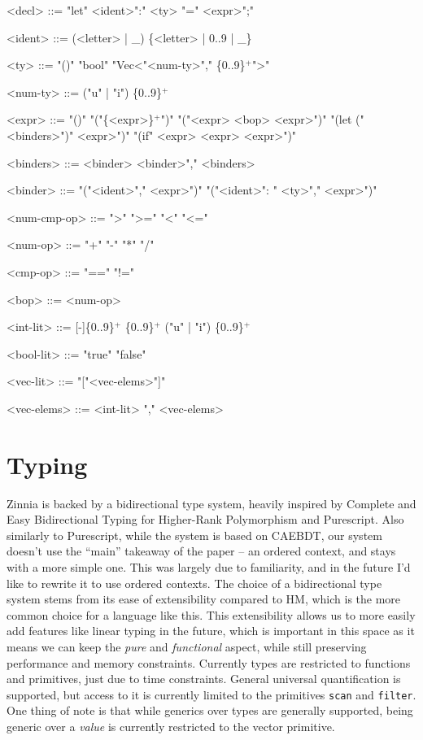 \documentclass[12pt]{article}
\begin{document}
\begin{grammar}

<decl> ::= "let" <ident>":" <ty> "=" <expr>";"

<ident> ::= (<letter> | _) \{<letter> | 0..9 | _\}

<ty> ::= "()"
    \alt "bool"
    \alt "Vec<"<num-ty>"," \{0..9\}$^+$">"

<num-ty> ::= ("u" | "i") \{0..9\}$^+$

<expr> ::= "()"
    \alt "("\{<expr>\}$^+$")"
    \alt "("<expr> <bop> <expr>")"
    \alt "(let ("<binders>")" <expr>")"
    \alt "(if" <expr> <expr> <expr>")"

<binders> ::= <binder> \alt <binder>"," <binders>

<binder> ::= "("<ident>"," <expr>")"
\alt "("<ident>": " <ty>"," <expr>")"

<num-cmp-op> ::= ">" \alt ">=" \alt "<" \alt "<="

<num-op> ::= "+" \alt "-" \alt "*" \alt "/" 

<cmp-op> ::= "==" \alt "!="

<bop> ::= <num-op>

<int-lit> ::= [-]\{0..9\}$^+$
    \alt [-]\{0..9\}$^+$ ("u" | "i") \{0..9\}$^+$

<bool-lit> ::= "true" \alt "false"

<vec-lit> ::= "["<vec-elems>"]"

<vec-elems> ::= <int-lit> "," <vec-elems>
\end{grammar}

\section{Typing}
Zinnia is backed by a bidirectional type system, heavily inspired by Complete and Easy Bidirectional Typing for Higher-Rank Polymorphism and Purescript. Also similarly to Purescript, while the system is based on CAEBDT, our system doesn't use the ``main'' takeaway of the paper -- an ordered context, and stays with a more simple one. This was largely due to familiarity, and in the future I'd like to rewrite it to use ordered contexts. The choice of a bidirectional type system stems from its ease of extensibility compared to HM, which is the more common choice for a language like this. This extensibility allows us to more easily add features like linear typing in the future, which is important in this space as it means we can keep the \textit{pure} and \textit{functional} aspect, while still preserving performance and memory constraints. Currently types are restricted to functions and primitives, just due to time constraints. General universal quantification is supported, but access to it is currently limited to the primitives \texttt{scan} and \texttt{filter}. One thing of note is that while generics over types are generally supported, being generic over a \textit{value} is currently restricted to the vector primitive.
\end{document}
